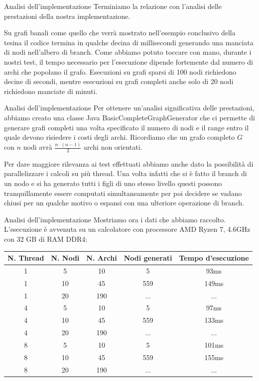 \documentclass[10pt]{beamer}
\begin{document}
\begin{frame}{Analisi dell'implementazione}
    Terminiamo la relazione con l'analisi delle prestazioni della nostra implementazione.
    
    Su grafi banali come quello che verrà mostrato nell'esempio conclusivo della tesina il codice termina in qualche decina di millisecondi generando una manciata di nodi nell'albero di branch. Come abbiamo potuto toccare con mano, durante i nostri test, il tempo necessario per l'esecuzione dipende fortemente dal numero di archi che popolano il grafo. Esecuzioni su grafi sparsi di 100 nodi richiedono decine di secondi, mentre esecuzioni su grafi completi anche solo di 20 nodi richiedono manciate di minuti.
\end{frame}

\begin{frame}{Analisi dell'implementazione}
    Per ottenere un'analisi significativa delle prestazioni, abbiamo creato una classe Java {\selectfont BasicCompleteGraphGenerator} che ci permette di generare grafi completi una volta specificato il numero di nodi e il range entro il quale devono risiedere i costi degli archi. Ricordiamo che un grafo completo $G$ con $n$ nodi avrà $\frac{n\cdot (n-1)}{2}$ archi non orientati.
    
    
    Per dare maggiore rilevanza ai test effettuati abbiamo anche dato la possibilità di parallelizzare i calcoli su più thread. Una volta infatti che si è fatto il branch di un nodo e si ha generato tutti i figli di uno stesso livello questi possono tranquillamente essere computati simultaneamente per poi decidere se vadano chiusi per un qualche motivo o espansi con una ulteriore operazione di branch.
\end{frame}

\begin{frame}{Analisi dell'implementazione}
Mostriamo ora i dati che abbiamo raccolto. L'esecuzione è avvenuta su un calcolatore con processore AMD Ryzen 7, 4.6GHz con 32 GB di RAM DDR4:
\begin{center}
 \begin{tabular}{||c c c c c||} 
 \hline
 N. Thread & N. Nodi & N. Archi & Nodi generati & Tempo d'esecuzione\\ [0.5ex] 
 \hline\hline
 1 & 5 & 10 & 5 & 93ms\\ 
 \hline
 1 & 10 & 45 & 559 & 149ms\\
 \hline
 1 & 20 & 190 & ... & ...\\
 \hline
 \hline
 4 & 5 & 10 & 5 & 97ms\\ 
 \hline
 4 & 10 & 45 & 559 & 133ms\\
 \hline
 4 & 20 & 190 & ... & ...\\
 \hline
 \hline
 8 & 5 & 10 & 5 & 101ms\\ 
 \hline
 8 & 10 & 45 & 559 & 155ms\\
 \hline
 8 & 20 & 190 & ... & ...\\
 \hline
\end{tabular}
\end{center}
\end{frame}
\end{document}
